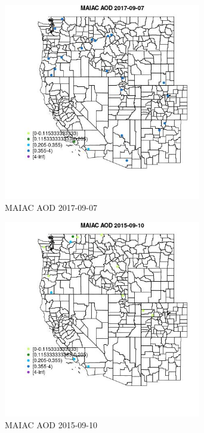 \begin{figure} 
\centering  
\includegraphics[width=0.77\textwidth]{Code_Outputs/Report_ML_input_PM25_Step4_part_e_de_duplicated_aveswNAs_MapObsMAIAC_AOD2017-09-07.jpg} 
\caption{\label{fig:Report_ML_input_PM25_Step4_part_e_de_duplicated_aveswNAsMapObsMAIAC_AOD2017-09-07}MAIAC AOD 2017-09-07} 
\end{figure} 
 

\clearpage 

\begin{figure} 
\centering  
\includegraphics[width=0.77\textwidth]{Code_Outputs/Report_ML_input_PM25_Step4_part_e_de_duplicated_aveswNAs_MapObsMAIAC_AOD2015-09-10.jpg} 
\caption{\label{fig:Report_ML_input_PM25_Step4_part_e_de_duplicated_aveswNAsMapObsMAIAC_AOD2015-09-10}MAIAC AOD 2015-09-10} 
\end{figure} 
 

